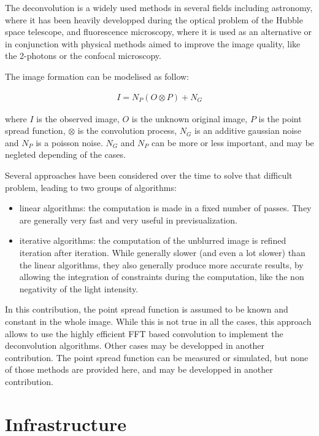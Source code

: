\documentclass{InsightArticle}
\begin{document}
The deconvolution is a widely used methods in several fields including astronomy, where it has been heavily developped
during the optical problem of the Hubble space telescope, and fluorescence microscopy, where it is used as an alternative
or in conjunction with physical methods aimed to improve the image quality, like the 2-photons or the confocal microscopy.

The image formation can be modelised as follow:


\begin{eqnarray}
\label{eq:imageFormation}
I = N_P( O \otimes P ) + N_G
\end{eqnarray}

where $I$ is the observed image, $O$ is the unknown original image, $P$ is the point spread function, $\otimes$ is the convolution process,
$N_G$ is an additive gaussian noise and $N_P$ is a poisson noise. $N_G$ and $N_P$ can be more or less important, and may be negleted
depending of the cases.

Several approaches have been considered over the time to solve that difficult problem, leading to two groups of algorithms:

\begin{itemize}
 \item linear algorithms: the computation is made in a fixed number of passes. They are generally very fast and very useful in previsualization.
 \item iterative algorithms: the computation of the unblurred image is refined iteration after iteration. While generally slower
(and even a lot slower) than the linear algorithms, they also generally produce more accurate results, by allowing the integration
of constraints during the computation, like the non negativity of the light intensity.
\end{itemize}

In this contribution, the point spread function is assumed to be known and constant in the whole image. While this is not
true in all the cases, this approach allows to use the highly efficient FFT based convolution to implement the deconvolution
algorithms. Other cases may be developped in another contribution. The point spread function can be measured or simulated, but
none of those methods are provided here, and may be developped in another contribution.

\section{Infrastructure}
\end{document}
